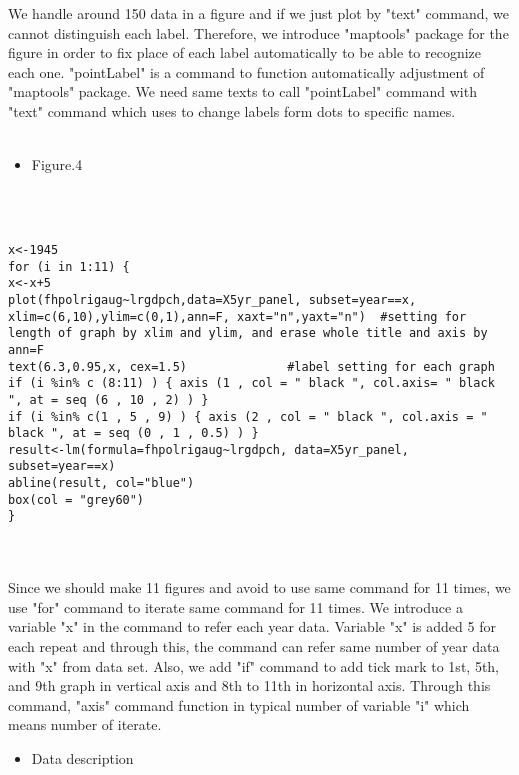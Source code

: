 \documentclass[a4paper,11pt]{article}
\begin{document}
We handle around 150 data in a figure and if we just plot by "text" command, we cannot distinguish each label. Therefore, we introduce "maptools" package for the figure in order to fix place of each label automatically to be able to recognize each one. "pointLabel" is a command to function automatically adjustment of "maptools" package. We need same texts to call "pointLabel" command with "text" command which uses to change labels form dots to specific names. 
\\
\\

\begin{itemize}
	\item Figure.4
\end{itemize}
\\
\\

\begin{lstlisting}
x<-1945
for (i in 1:11) {
x<-x+5
plot(fhpolrigaug~lrgdpch,data=X5yr_panel, subset=year==x,
xlim=c(6,10),ylim=c(0,1),ann=F, xaxt="n",yaxt="n")  #setting for length of graph by xlim and ylim, and erase whole title and axis by ann=F
text(6.3,0.95,x, cex=1.5)              #label setting for each graph
if (i %in% c (8:11) ) { axis (1 , col = " black ", col.axis= " black ", at = seq (6 , 10 , 2) ) }
if (i %in% c(1 , 5 , 9) ) { axis (2 , col = " black ", col.axis = " black ", at = seq (0 , 1 , 0.5) ) }
result<-lm(formula=fhpolrigaug~lrgdpch, data=X5yr_panel, subset=year==x)
abline(result, col="blue")
box(col = "grey60")
}
\end{lstlisting}

\\

\\

Since we should make 11 figures and avoid to use same command for 11 times, we use "for" command to iterate same command for 11 times. We introduce a variable "x" in the command to refer each year data.  Variable "x" is added 5 for each repeat and through this, the command can refer same number of year data with "x" from data set. Also, we add "if" command to add tick mark to 1st, 5th, and 9th graph in vertical axis and 8th to 11th in horizontal axis. Through this command, "axis" command function in typical number of variable "i" which means number of iterate.

\newpage

\begin{itemize}
	\item Data description
\end{itemize}
\end{document}
